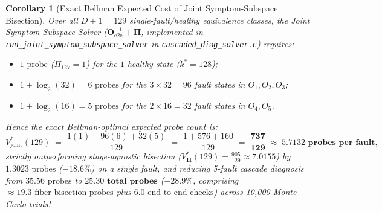 \documentclass[11pt,a4paper]{article}
\newtheorem{corollary}[theorem]{Corollary}
\theoremstyle{definition}
\theoremstyle{remark}
\begin{document}
\begin{corollary}[Exact Bellman Expected Cost of Joint Symptom-Subspace Bisection]
Over all $D+1 = 129$ single-fault/healthy equivalence classes, the Joint Symptom-Subspace Solver ($\bm{O}_{\text{e2e}}^{-1} + \bm{\Pi}$, implemented in \texttt{run\_joint\_symptom\_subspace\_solver} in \texttt{cascaded\_diag\_solver.c}) requires:
\begin{itemize}
    \item $1\text{ probe}$ ($\Pi_{127} = 1$) for the $1$ healthy state ($k^* = 128$);
    \item $1 + \log_2(32) = 6\text{ probes}$ for the $3 \times 32 = 96$ fault states in $O_1, O_2, O_3$;
    \item $1 + \log_2(16) = 5\text{ probes}$ for the $2 \times 16 = 32$ fault states in $O_4, O_5$.
\end{itemize}
Hence the exact Bellman-optimal expected probe count is:
\begin{equation}
    V_{\text{joint}}^*(129) \;=\; \frac{1(1) + 96(6) + 32(5)}{129} \;=\; \frac{1 + 576 + 160}{129} \;=\; \mathbf{\frac{737}{129} \;\approx\; 5.7132\text{ probes per fault}},
\end{equation}
strictly outperforming stage-agnostic bisection ($V_{\bm{\Pi}}^*(129) = \frac{905}{129} \approx 7.0155$) by $1.3023\text{ probes}$ ($-18.6\%$) on a single fault, and reducing 5-fault cascade diagnosis from $35.56\text{ probes}$ to $\mathbf{25.30\text{ total probes}}$ ($-28.9\%$, comprising $\approx 19.3\text{ fiber bisection probes}$ plus $6.0\text{ end-to-end checks}$) across 10,000 Monte Carlo trials!
\end{corollary}
\end{document}
